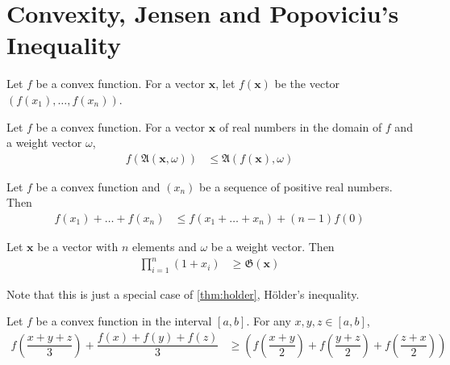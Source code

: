 \documentclass{subfile}
\begin{document}
	\section[Jensen and Popoviciu]{Convexity, Jensen and Popoviciu's Inequality}\label{sec:convexity}
	
	Let $f$ be a convex function. For a vector $\mathbf{x}$, let $f(\mathbf{x})$ be the vector $(f(x_{1}),\ldots,f(x_{n}))$.
		\begin{theorem}\label{thm:jensen}
			Let $f$ be a convex function. For a vector $\mathbf{x}$ of real numbers in the domain of $f$ and a weight vector $\omega$,
				\begin{align*}
					f\left(\mathfrak{A}(\mathbf{x},\omega)\right)
						& \leq \mathfrak{A}(f(\mathbf{x}),\omega)
				\end{align*}
		\end{theorem}
	
		\begin{theorem}
			Let $f$ be a convex function and $(x_{n})$ be a sequence of positive real numbers. Then
				\begin{align*}
					f(x_{1})+\ldots+f(x_{n})
						& \leq f(x_{1}+\ldots+x_{n})+(n-1)f(0)
				\end{align*}
		\end{theorem}
	
		\begin{theorem}
			Let $\mathbf{x}$ be a vector with $n$ elements and $\omega$ be a weight vector. Then
				\begin{align*}
					\prod_{i=1}^{n}(1+x_{i})
						& \geq \mathfrak{G}(\mathbf{x})
				\end{align*}
		\end{theorem}
	Note that this is just a special case of \autoref{thm:holder}, H\"{o}lder's inequality.
		\begin{theorem}
			Let $f$ be a convex function in the interval $[a,b]$. For any $x,y,z\in[a,b]$,
				\begin{align*}
					f\left(\dfrac{x+y+z}{3}\right)+\dfrac{f(x)+f(y)+f(z)}{3}
						& \geq \left(f\left(\dfrac{x+y}{2}\right)+f\left(\dfrac{y+z}{2}\right)+f\left(\dfrac{z+x}{2}\right)\right)
				\end{align*}
		\end{theorem}
\end{document}
